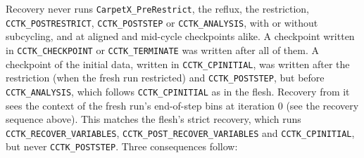 Recovery never runs \texttt{CarpetX\_PreRestrict}, the reflux, the restriction, \texttt{CCTK\_POSTRESTRICT}, \texttt{CCTK\_POSTSTEP} or \texttt{CCTK\_ANALYSIS}, with or without subcycling, and at aligned and mid-cycle checkpoints alike. A checkpoint written in \texttt{CCTK\_CHECKPOINT} or \texttt{CCTK\_TERMINATE} was written after all of them. A checkpoint of the initial data, written in \texttt{CCTK\_CPINITIAL}, was written after the restriction (when the fresh run restricted) and \texttt{CCTK\_POSTSTEP}, but before \texttt{CCTK\_ANALYSIS}, which follows \texttt{CCTK\_CPINITIAL} as in the \Cactus\space flesh. Recovery from it sees the context of the fresh run's end-of-step bins at iteration 0 (see the recovery sequence above). This matches the \Cactus\space flesh's strict recovery, which runs \texttt{CCTK\_RECOVER\_VARIABLES}, \texttt{CCTK\_POST\_RECOVER\_VARIABLES} and \texttt{CCTK\_CPINITIAL}, but never \texttt{CCTK\_POSTSTEP}. Three consequences follow:
%
